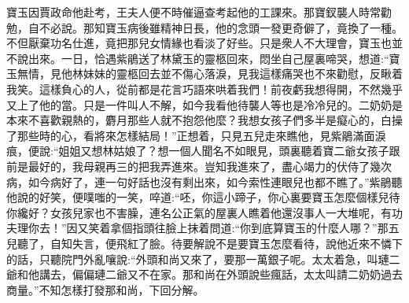 \begin{parag}
    寶玉因賈政命他赴考，王夫人便不時催逼查考起他的工課來。那寶釵襲人時常勸勉，自不必說。那知寶玉病後雖精神日長，他的念頭一發更奇僻了，竟換了一種。不但厭棄功名仕進，竟把那兒女情緣也看淡了好些。只是衆人不大理會，寶玉也並不說出來。一日，恰遇紫鵑送了林黛玉的靈柩回來，悶坐自己屋裏啼哭，想道:“寶玉無情，見他林妹妹的靈柩回去並不傷心落淚，見我這樣痛哭也不來勸慰，反瞅着我笑。這樣負心的人，從前都是花言巧語來哄着我們！前夜虧我想得開，不然幾乎又上了他的當。只是一件叫人不解，如今我看他待襲人等也是冷冷兒的。二奶奶是本來不喜歡親熱的，麝月那些人就不抱怨他麼？我想女孩子們多半是癡心的，白操了那些時的心，看將來怎樣結局！”正想着，只見五兒走來瞧他，見紫鵑滿面淚痕，便說:“姐姐又想林姑娘了？想一個人聞名不如眼見，頭裏聽着寶二爺女孩子跟前是最好的，我母親再三的把我弄進來。豈知我進來了，盡心竭力的伏侍了幾次病，如今病好了，連一句好話也沒有剩出來，如今索性連眼兒也都不瞧了。”紫鵑聽他說的好笑，便噗嗤的一笑，啐道:“呸，你這小蹄子，你心裏要寶玉怎麼個樣兒待你纔好？女孩兒家也不害臊，連名公正氣的屋裏人瞧着他還沒事人一大堆呢，有功夫理你去！”因又笑着拿個指頭往臉上抹着問道:“你到底算寶玉的什麼人哪？”那五兒聽了，自知失言，便飛紅了臉。待要解說不是要寶玉怎麼看待，說他近來不憐下的話，只聽院門外亂嚷說:“外頭和尚又來了，要那一萬銀子呢。太太着急，叫璉二爺和他講去，偏偏璉二爺又不在家。那和尚在外頭說些瘋話，太太叫請二奶奶過去商量。”不知怎樣打發那和尚，下回分解。
\end{parag}